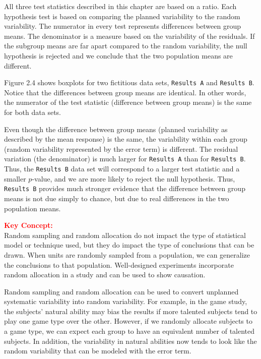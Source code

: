 \documentclass[
]{report}
\begin{document}
All three test statistics described in this chapter are based on a ratio. Each hypothesis test is based on comparing the planned variability to the random variability. The numerator in every test represents differences between group means. The denominator is a measure based on the variability of the residuals. If the subgroup means are far apart compared to the random variability, the null hypothesis is rejected and we conclude that the two population means are different.

Figure 2.4 shows boxplots for two fictitious data sets, \texttt{Results\ A} and \texttt{Results\ B}. Notice that the differences between group means are identical. In other words, the numerator of the test statistic (difference between group means) is the same for both data sets.

Even though the difference between group means (planned variability as described by the mean response) is the same, the variability within each group (random variability represented by the error term) is different. The residual variation (the denominator) is much larger for \texttt{Results\ A} than for \texttt{Results\ B}. Thus, the \texttt{Results\ B} data set will correspond to a larger test statistic and a smaller \(p\)-value, and we are more likely to reject the null hypothesis. Thus, \texttt{Results\ B} provides much stronger evidence that the difference between group means is not due simply to chance, but due to real differences in the two population means.

\large

\textbf{\textcolor{red}{Key Concept:}}\\
\color{red}
Random sampling and random allocation do not impact the type of statistical model or technique used, but they do impact the type of conclusions that can be drawn. When units are randomly sampled from a population, we can generalize the conclusions to that population. Well-designed experiments incorporate random allocation in a study and can be used to show causation.
\color{black}
\normalsize

Random sampling and random allocation can be used to convert unplanned systematic variability into random variability. For example, in the game study, the subjects' natural ability may bias the results if more talented subjects tend to play one game type over the other. However, if we randomly allocate subjects to a game type, we can expect each group to have an equivalent number of talented subjects. In addition, the variability in natural abilities now tends to look like the random variability that can be modeled with the error term.
\end{document}
